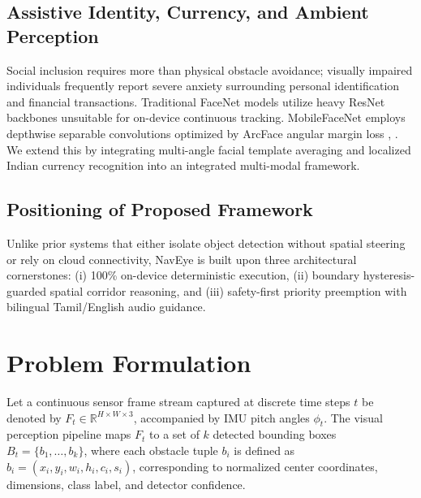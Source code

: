 \documentclass[conference]{IEEEtran}
\begin{document}
\subsection{Assistive Identity, Currency, and Ambient Perception}
Social inclusion requires more than physical obstacle avoidance; visually impaired individuals frequently report severe anxiety surrounding personal identification and financial transactions. Traditional FaceNet models utilize heavy ResNet backbones unsuitable for on-device continuous tracking. MobileFaceNet employs depthwise separable convolutions optimized by ArcFace angular margin loss \cite{b2}, \cite{b9}. We extend this by integrating multi-angle facial template averaging and localized Indian currency recognition into an integrated multi-modal framework.

\subsection{Positioning of Proposed Framework}
Unlike prior systems that either isolate object detection without spatial steering or rely on cloud connectivity, NavEye is built upon three architectural cornerstones: (i) 100\% on-device deterministic execution, (ii) boundary hysteresis-guarded spatial corridor reasoning, and (iii) safety-first priority preemption with bilingual Tamil/English audio guidance.

\section{Problem Formulation}
Let a continuous sensor frame stream captured at discrete time steps $t$ be denoted by $F_t \in \mathbb{R}^{H \times W \times 3}$, accompanied by IMU pitch angles $\phi_t$. The visual perception pipeline maps $F_t$ to a set of $k$ detected bounding boxes $B_t = \{b_1, \dots, b_k\}$, where each obstacle tuple $b_i$ is defined as $b_i = (x_i, y_i, w_i, h_i, c_i, s_i)$, corresponding to normalized center coordinates, dimensions, class label, and detector confidence.
\end{document}
